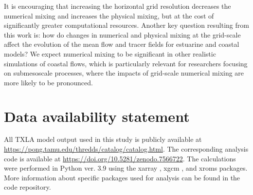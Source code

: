 \documentclass[draft]{agujournal2019}
\begin{document}
It is encouraging that increasing the horizontal grid resolution decreases the numerical mixing and increases the physical mixing, but at the cost of significantly greater computational resources. Another key question resulting from this work is: how do changes in numerical and physical mixing at the grid-scale affect the evolution of the mean flow and tracer fields for estuarine and coastal models? We expect numerical mixing to be significant in other realistic simulations of coastal flows, which is particularly relevant for researchers focusing on submesoscale processes, where the impacts of grid-scale numerical mixing are more likely to be pronounced.

\section*{Data availability statement}

All TXLA model output used in this study is publicly available at \url{https://pong.tamu.edu/thredds/catalog/catalog.html}. The corresponding analysis code is available at \url{https://doi.org/10.5281/zenodo.7566722}. The calculations were performed in Python ver. 3.9 using the xarray \cite{hoyer_stephan_2021_5771208}, xgcm \cite{abernathey_ryan_p_2022_6643579}, and xroms \cite{xroms} packages. More information about specific packages used for analysis can be found in the code repository. 

\end{document}
